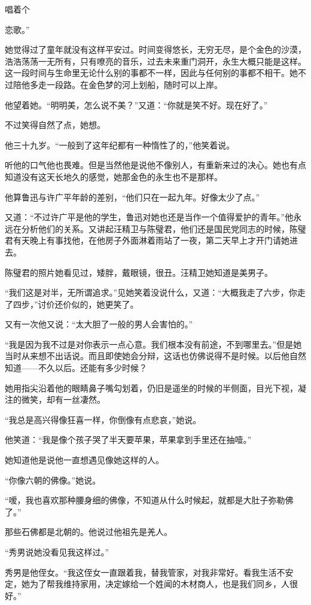 \par 唱着个
\par 恋歌。”
\par 她觉得过了童年就没有这样平安过。时间变得悠长，无穷无尽，是个金色的沙漠，浩浩荡荡一无所有，只有嘹亮的音乐，过去未来重门洞开，永生大概只能是这样。这一段时间与生命里无论什么别的事都不一样，因此与任何别的事都不相干。她不过陪他多走一段路。在金色梦的河上划船，随时可以上岸。
\par 他望着她。“明明美，怎么说不美？”又道：“你就是笑不好。现在好了。”
\par 不过笑得自然了点，她想。
\par 他三十九岁。“一般到了这年纪都有一种惰性了的，”他笑着说。
\par 听他的口气他也畏难。但是当然他是说他不像别人，有重新来过的决心。她也有点知道没有这天长地久的感觉，她那金色的永生也不是那样。
\par 他算鲁迅与许广平年龄的差别，“他们只在一起九年。好像太少了点。”
\par 又道：“不过许广平是他的学生，鲁迅对她也还是当作一个值得爱护的青年。”他永远在分析他们的关系。又讲起汪精卫与陈璧君，他们还是国民党同志的时候，陈璧君有天晚上有事找他，在他房子外面淋着雨站了一夜，第二天早上才开门请她进去。
\par 陈璧君的照片她看见过，矮胖，戴眼镜，很丑。汪精卫她知道是美男子。
\par “我们这是对半，无所谓追求。”见她笑着没说什么，又道：“大概我走了六步，你走了四步，”讨价还价似的，她更笑了。
\par 又有一次他又说：“太大胆了一般的男人会害怕的。”
\par “我是因为我不过是对你表示一点心意。我们根本没有前途，不到哪里去。”但是她当时从来想不出话说。而且即使她会分辩，这话也仿佛说得不是时候。以后他自然知道——不久以后。还能有多少时候？
\par 她用指尖沿着他的眼睛鼻子嘴勾划着，仍旧是遥坐的时候的半侧面，目光下视，凝注的微笑，却有一丝凄然。
\par “我总是高兴得像狂喜一样，你倒像有点悲哀，”她说。
\par 他笑道：“我是像个孩子哭了半天要苹果，苹果拿到手里还在抽噎。”
\par 她知道他是说他一直想遇见像她这样的人。
\par “你像六朝的佛像。”她说。
\par “嗳，我也喜欢那种腰身细的佛像，不知道从什么时候起，就都是大肚子弥勒佛了。”
\par 那些石佛都是北朝的。他说过他祖先是羌人。
\par “秀男说她没看见我这样过。”
\par 秀男是他侄女。“我这侄女一直跟着我，替我管家，对我非常好。看我生活不安定，她为了帮我维持家用，决定嫁给一个姓闻的木材商人，也是我们同乡，人很好。”
